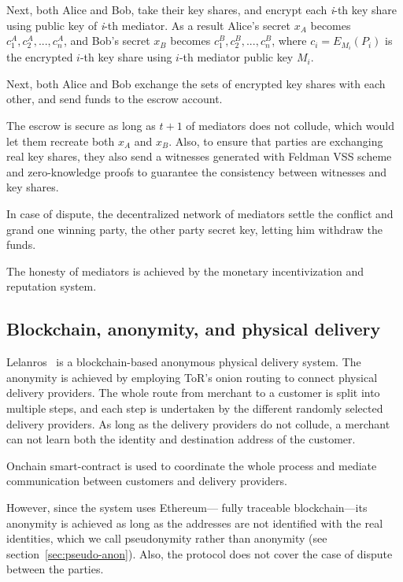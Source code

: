 \documentclass{ieeeaccess}
\begin{document}
Next, both Alice and Bob, take their key shares, and encrypt each
\textit{i}-th key share using public key of \textit{i}-th mediator. As a result
Alice's secret \(x_A\) becomes \({c^A_1, c^A_2,...,c^A_n}\), and Bob's
secret \(x_B\) becomes \({c^B_1, c^B_2,...,c^B_n}\), where
\(c_i = E_{M_i}(P_i)\) is the encrypted \(i\)-th key share using
\(i\)-th mediator public key \(M_i\).

Next, both Alice and Bob exchange the sets of encrypted key shares with
each other, and send funds to the escrow account.

The escrow is secure as long as \(t+1\) of mediators does not collude,
which would let them recreate both \(x_A\) and \(x_B\). Also, to ensure
that parties are exchanging real key shares, they also send a witnesses
generated with Feldman VSS scheme and zero-knowledge proofs to guarantee
the consistency between witnesses and key shares.

In case of dispute, the decentralized network of mediators settle the
conflict and grand one winning party, the other party secret key,
letting him withdraw the funds.

The honesty of mediators is achieved by the monetary incentivization and
reputation system.


\subsection{Blockchain, anonymity, and physical delivery}\label{lelantos-a-blockchain-based-anonymous-physical-delivery-system}

Lelanros~\cite{altawy2017lelantos} is a blockchain-based anonymous
physical delivery system. The anonymity is achieved by employing ToR's
onion routing to connect physical delivery providers. The whole route
from merchant to a customer is split into multiple steps, and each step is
undertaken by the different randomly selected delivery providers. As long as
the delivery providers do not collude, a merchant can not learn both
the identity and destination address of the customer.

Onchain smart-contract is used to coordinate the whole process and
mediate communication between customers and delivery providers.

However, since the system uses Ethereum— fully traceable blockchain—its anonymity is achieved as long as the addresses are not identified with the real identities, which we call pseudonymity rather than anonymity (see section~\ref{sec:pseudo-anon}). Also, the protocol does not cover the case of dispute between the parties.
 
\end{document}
